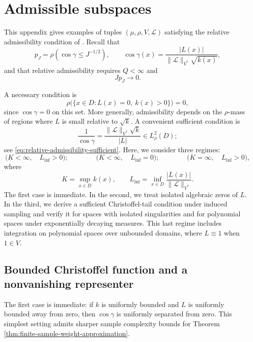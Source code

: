 \documentclass[10pt,dvipsnames]{amsart}
\begin{document}
\clearpage

\appendix

\section{Admissible subspaces}
\label{app:subspaces}

This appendix gives examples of tuples
\((\mu,\rho,V,\mathcal L)\) satisfying the relative admissibility condition
of . Recall that
\[
    p_J
    =
    \rho\left(
        \cos\gamma\leq J^{-1/2}
    \right),
    \qquad
    \cos\gamma(x)
    =
    \frac{|L(x)|}
    {\|\mathcal L\|_{V^*}\sqrt{k(x)}},
\]
and that relative admissibility requires \(Q<\infty\) and
\[
    Jp_J\longrightarrow0.
\]

A necessary condition is
\[
    \rho\bigl(\{x\in D:L(x)=0,\ k(x)>0\}\bigr)=0,
\]
since \(\cos\gamma=0\) on this set. More generally, admissibility depends on
the \(\rho\)-mass of regions where \(L\) is small relative to \(\sqrt{k}\).
A convenient sufficient condition is
\[
    \frac{1}{\cos\gamma}
    =
    \frac{\|\mathcal L\|_{V^*}\sqrt{k}}{|L|}
    \in L^2_\rho(D);
\]
see \eqref{eq:relative-admissibility-sufficient}. Here, we consider three regimes:
\[
    \big(K<\infty,\quad L_{\inf}>0\big);
    \qquad\qquad
    \big(K<\infty,\quad L_{\inf}=0\big);
    \qquad\qquad
    \big(K=\infty,\quad L_{\inf}>0\big),
\]
where
\[
    K=\sup_{x\in D}k(x),
    \qquad
    L_{\inf}
    =
    \inf_{x\in D}
    \frac{|L(x)|}{\|\mathcal L\|_{V^*}}.
\]
The first case is immediate. In the second, we treat isolated algebraic
zeros of \(L\). In the third, we derive a sufficient Christoffel-tail
condition under induced sampling and verify it for spaces with isolated
singularities and for polynomial spaces under exponentially decaying
measures. This last regime includes integration on polynomial spaces over
unbounded domains, where \(L\equiv1\) when \(1\in V\).


\subsection{Bounded Christoffel function and a nonvanishing representer}
\label{ssec:finite-K-positive-Linf}

The first case is immediate: if \(k\) is uniformly bounded and \(L\) is
uniformly bounded away from zero, then \(\cos\gamma\) is uniformly separated from zero. This simplest setting admits sharper sample complexity bounds for Theorem \ref{thm:finite-sample-weight-approximation}.
\end{document}
